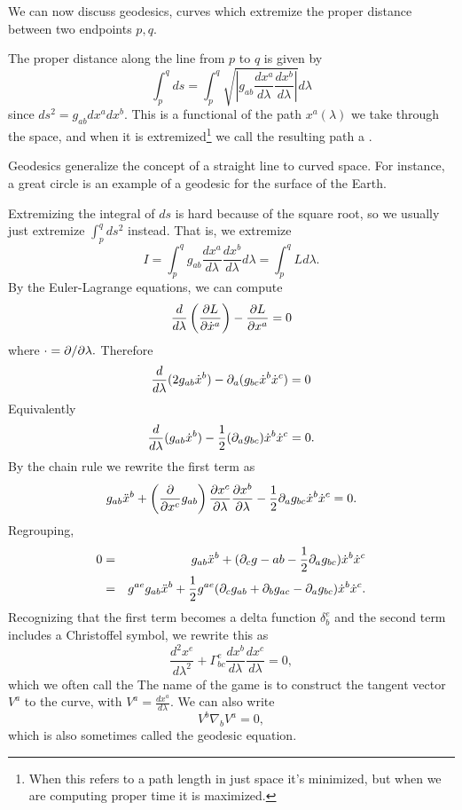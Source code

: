 We can now discuss geodesics, curves which extremize the proper distance between two endpoints $p,q$. 
\begin{defn}
The proper distance along the line from $p$ to $q$ is given by
$$\int_p^q ds = \int_p^q \sqrt{\left|g_{ab}\frac{dx^a}{d\lambda} \frac{dx^b}{d\lambda}\right|} d\lambda$$
since $ds^2=g_{ab} dx^a dx^b.$ This is a functional of the path $x^a(\lambda)$ we take through the space, and when it is extremized\footnote{When this refers to a path length in just space it's minimized, but when we are computing proper time it is maximized.} we call the resulting path a . 
\end{defn}
Geodesics generalize the concept of a straight line to curved space. For instance, a great circle is an example of a geodesic for the surface of the Earth.

Extremizing the integral of $ds$ is hard because of the square root, so we usually just extremize $\int_p^q ds^2$ instead. That is, we extremize
$$I=\int_p^q g_{ab}\frac{dx^a}{d\lambda} \frac{dx^b}{d\lambda} d\lambda= \int_p^q L d\lambda.$$
By the Euler-Lagrange equations, we can compute
$$\frac{d}{d\lambda} \left(\frac{\partial L}{\partial \dot x^a}\right)- \frac{\partial L}{\partial x^a}=0$$
where $\cdot = \partial/\partial\lambda.$
Therefore
$$\frac{d}{d\lambda}(2g_{ab}\dot x^{b}) -\partial_a (g_{bc} \dot x^b \dot x^c) =0$$
Equivalently
$$\frac{d}{d\lambda}(g_{ab}\dot x^b)-\frac{1}{2}(\partial_a g_{bc})\dot x^b \dot x^c =0.$$
By the chain rule we rewrite the first term as
$$g_{ab}\ddot x^b +\left(\frac{\partial}{\partial x^c}g_{ab}\right) \frac{\partial x^c}{\partial \lambda} \frac{\partial x^b}{\partial \lambda}-\frac{1}{2}\partial_a g_{bc} \dot x^b \dot x^c=0.$$
Regrouping,
\begin{eqnarray*}
0&=& g_{ab} \ddot x^b + (\partial_c g-{ab}-\frac{1}{2}\partial_a g_{bc})\dot x^b \dot x^c\\
&=& g^{ae}g_{ab} \ddot x^b +\frac{1}{2} g^{ae}(\partial_c g_{ab}+\partial_b g_{ac}-\partial_a g_{bc})\dot x^b \dot x^c.
\end{eqnarray*}
Recognizing that the first term becomes a delta function $\delta^e_b$ and the second term includes a Christoffel symbol, we rewrite this as
$$\frac{d^2x^e}{d\lambda^2}+\Gamma^e_{bc}\frac{dx^b}{d\lambda} \frac{dx^c}{d\lambda}=0,$$
which we often call the  The name of the game is to construct the tangent vector $V^a$ to the curve, with $V^a=\frac{dx^a}{d\lambda}.$
We can also write
$$V^b \nabla_b V^a = 0,$$
which is also sometimes called the geodesic equation.